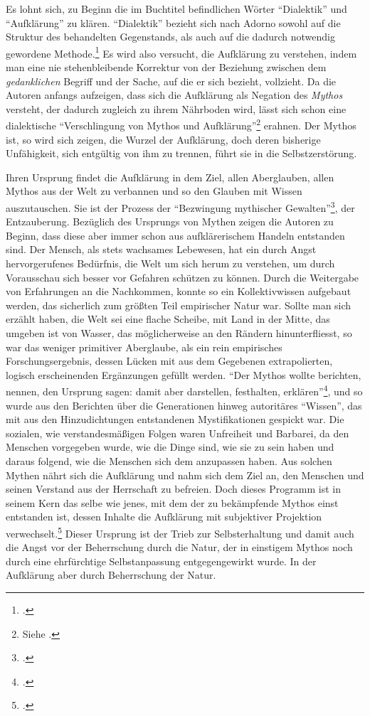 \documentclass[a4paper, 12pt]{article}
\begin{document}
\begin{onehalfspace}
Es lohnt sich, zu Beginn die im Buchtitel befindlichen Wörter "`Dialektik"' und "`Aufklärung"' zu klären. "`Dialektik"' bezieht sich nach Adorno sowohl auf die Struktur des behandelten Gegenstands, als auch auf die dadurch notwendig gewordene Methode.\footnote{\Cite[Vgl.][S. 9]{dialektik}.} Es wird also versucht, die Aufklärung zu verstehen, indem man eine nie stehenbleibende Korrektur von der Beziehung zwischen dem \emph{gedanklichen} Begriff und der Sache, auf die er sich bezieht, vollzieht. Da die Autoren anfangs aufzeigen, dass sich die Aufklärung als Negation des \emph{Mythos} versteht, der dadurch zugleich zu ihrem Nährboden wird, lässt sich schon eine dialektische "`Verschlingung von Mythos und Aufklärung"'\footnote{Siehe \Cite{habermas}.} erahnen. Der Mythos ist, so wird sich zeigen, die Wurzel der Aufklärung, doch deren bisherige Unfähigkeit, sich entgültig von ihm zu trennen, führt sie in die Selbstzerstörung.

Ihren Ursprung findet die Aufklärung in dem Ziel, allen Aberglauben, allen Mythos aus der Welt zu verbannen und so den Glauben mit Wissen auszutauschen. Sie ist der Prozess der "`Bezwingung mythischer Gewalten"'\footnote{\Cite[Siehe][S. 408]{habermas}.}, der Entzauberung. Bezüglich des Ursprungs von Mythen zeigen die Autoren zu Beginn, dass diese aber immer schon aus aufklärerischem Handeln entstanden sind. Der Mensch, als stets wachsames Lebewesen, hat ein durch Angst hervorgerufenes Bedürfnis, die Welt um sich herum zu verstehen, um durch Vorausschau sich besser vor Gefahren schützen zu können. Durch die Weitergabe von Erfahrungen an die Nachkommen, konnte so ein Kollektivwissen aufgebaut werden, das sicherlich zum größten Teil empirischer Natur war. Sollte man sich erzählt haben, die Welt sei eine flache Scheibe, mit Land in der Mitte, das umgeben ist von Wasser, das möglicherweise an den Rändern hinunterfliesst, so war das weniger primitiver Aberglaube, als ein rein empirisches Forschungsergebnis, dessen Lücken mit aus dem Gegebenen extrapolierten, logisch erscheinenden Ergänzungen gefüllt werden. "`Der Mythos wollte berichten, nennen, den Ursprung sagen: damit aber darstellen, festhalten, erklären"'\footnote{\Cite[Siehe][S. 14]{dialektik-der-aufklaerung}.}, und so wurde aus den Berichten über die Generationen hinweg autoritäres "`Wissen"', das mit aus den Hinzudichtungen entstandenen Mystifikationen gespickt war. Die sozialen, wie verstandesmäßigen Folgen waren Unfreiheit und Barbarei, da den Menschen vorgegeben wurde, wie die Dinge sind, wie sie zu sein haben und daraus folgend, wie die Menschen sich dem anzupassen haben. Aus solchen Mythen nährt sich die Aufklärung und nahm sich dem Ziel an, den Menschen und seinen Verstand aus der Herrschaft zu befreien. Doch dieses Programm ist in seinem Kern das selbe wie jenes, mit dem der zu bekämpfende Mythos einst entstanden ist, dessen Inhalte die Aufklärung mit subjektiver Projektion verwechselt.\footnote{\Cite[Vgl.][S. 12]{dialektik-der-aufklaerung}.} Dieser Ursprung ist der Trieb zur Selbsterhaltung und damit auch die Angst vor der Beherrschung durch die Natur, der in einstigem Mythos noch durch eine ehrfürchtige Selbstanpassung entgegengewirkt wurde. In der Aufklärung aber durch Beherrschung der Natur. 


\end{onehalfspace}
\end{document}

